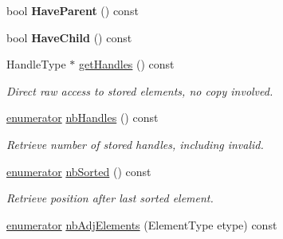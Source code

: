 \begin{DoxyCompactItemize}
\item 
\hypertarget{classINMOST_1_1ElementSet_a9c3a20b2d85554fa5d2abe5b59bc40b1}{bool {\bfseries Have\-Parent} () const }\label{classINMOST_1_1ElementSet_a9c3a20b2d85554fa5d2abe5b59bc40b1}

\item 
\hypertarget{classINMOST_1_1ElementSet_ae9f727556f696cf336349a4ff7ab8774}{bool {\bfseries Have\-Child} () const }\label{classINMOST_1_1ElementSet_ae9f727556f696cf336349a4ff7ab8774}

\item 
Handle\-Type $\ast$ \hyperlink{classINMOST_1_1ElementSet_a9f9a30cf2c426e7e225950c7627143f8}{get\-Handles} () const 
\begin{DoxyCompactList}\small\item\em Direct raw access to stored elements, no copy involved. \end{DoxyCompactList}\item 
\hyperlink{classINMOST_1_1Storage_ae333dfced6fa9cfde0c8e7dcf1b0cc2b}{enumerator} \hyperlink{classINMOST_1_1ElementSet_a97aa938d4e6060235056a67042b5cbe8}{nb\-Handles} () const 
\begin{DoxyCompactList}\small\item\em Retrieve number of stored handles, including invalid. \end{DoxyCompactList}\item 
\hyperlink{classINMOST_1_1Storage_ae333dfced6fa9cfde0c8e7dcf1b0cc2b}{enumerator} \hyperlink{classINMOST_1_1ElementSet_a7887bbf333dd08f1d3a8132728c1992b}{nb\-Sorted} () const 
\begin{DoxyCompactList}\small\item\em Retrieve position after last sorted element. \end{DoxyCompactList}\item 
\hypertarget{classINMOST_1_1ElementSet_a47eeee88d1c207c2cef615721013d102}{\hyperlink{classINMOST_1_1Storage_ae333dfced6fa9cfde0c8e7dcf1b0cc2b}{enumerator} \hyperlink{classINMOST_1_1ElementSet_a47eeee88d1c207c2cef615721013d102}{nb\-Adj\-Elements} (Element\-Type etype) const }\label{classINMOST_1_1ElementSet_a47eeee88d1c207c2cef615721013d102}


\end{DoxyCompactItemize}

